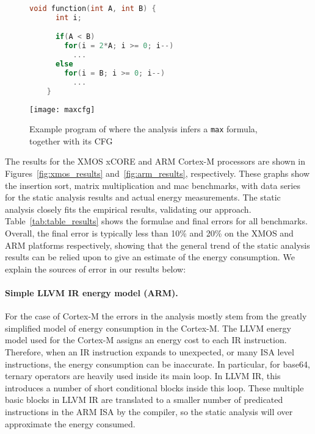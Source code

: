 \documentclass[9pt,preprint]{sigplanconf}
\begin{document}
\begin{figure}
\begin{minipage}[b]{0.53\linewidth}
{\nocaptionrule
\begin{lstlisting}[language=c,gobble=4]
    void function(int A, int B) {
      int i;

      if(A < B)
        for(i = 2*A; i >= 0; i--)
          ...
      else
        for(i = B; i >= 0; i--)
          ...
    }
\end{lstlisting}}
\end{minipage}
\hfill
\begin{minipage}[b]{0.43\linewidth}
  \centering
  \texttt{[image: maxcfg]}
  \label{fig:max_cfg}
\end{minipage}
\caption{\label{lst:max_example}Example program of where the analysis infers a \texttt{max} formula,
  together with its CFG}
\end{figure}

The results for the XMOS xCORE and ARM Cortex-M processors are shown in
Figures~\ref{fig:xmos_results} and~\ref{fig:arm_results}, respectively. These
graphs show the insertion sort, matrix multiplication and mac benchmarks, with
data series for the static analysis results and actual energy measurements. The static
analysis closely fits the empirical results, validating our
approach. Table~\ref{tab:table_results} shows the formulae and final errors for
all benchmarks. Overall, the final error is typically less than 10\% and 20\% on
the XMOS and ARM platforms respectively,
showing that the general trend of the static analysis results can be relied upon to give
an estimate of the energy consumption. We explain the sources of error in our results below:

\paragraph{Simple LLVM IR energy model (ARM).}
For the case of Cortex-M the errors in the analysis mostly stem from the greatly
simplified model of energy consumption in the Cortex-M. The LLVM energy model
used for the Cortex-M assigns an energy cost to each IR instruction. Therefore,
when an IR instruction expands to unexpected, or many ISA level instructions,
the energy consumption can be inaccurate. In particular, for base64, ternary
operators are heavily used inside its main loop. In LLVM IR, this introduces a
number of short conditional blocks inside this loop. These multiple basic blocks in LLVM
IR are translated to a smaller number of predicated instructions in the ARM ISA
by the compiler, so the static analysis will over approximate the energy consumed.
\end{document}
